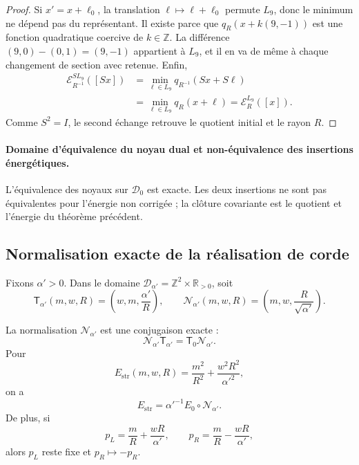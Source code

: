 \begin{proof}
Si \(x'=x+\ell_0\), la translation
\(\ell\mapsto\ell+\ell_0\) permute \(L_9\), donc le minimum ne dépend pas du
représentant. Il existe parce que \(q_R(x+k(9,-1))\) est une fonction quadratique
coercive de \(k\in\mathbb Z\). La différence
\((9,0)-(0,1)=(9,-1)\) appartient à \(L_9\), et il en va de même à chaque changement
de section avec retenue. Enfin,
\[
\begin{aligned}
 \mathcal E_{R^{-1}}^{SL_9}([Sx])
 &=\min_{\ell\in L_9}q_{R^{-1}}(Sx+S\ell)\\
 &=\min_{\ell\in L_9}q_R(x+\ell)
 =\mathcal E_R^{L_9}([x]).
\end{aligned}
\]
Comme \(S^2=I\), le second échange retrouve le quotient initial et le
rayon \(R\).
\end{proof}

\paragraph{Domaine d'équivalence du noyau dual et non-équivalence des insertions énergétiques.}
L'équivalence des noyaux sur \(\mathscr D_0\) est exacte. Les deux
insertions ne sont pas équivalentes pour l'énergie non corrigée ; la clôture
covariante est le quotient et l'énergie du théorème précédent.

\subsection{Normalisation exacte de la réalisation de corde}

Fixons \(\alpha'>0\). Dans le domaine
\(\mathscr D_{\alpha'}=\mathbb Z^2\times\mathbb R_{>0}\), soit
\[
 \mathsf T_{\alpha'}(m,w,R)=\left(w,m,\frac{\alpha'}R\right),
 \qquad
 \mathcal N_{\alpha'}(m,w,R)
 =\left(m,w,\frac R{\sqrt{\alpha'}}\right).
\]

\begin{theorem}
\label{thm:cierre-vtm-normalizacion-alpha-t}
La normalisation \(\mathcal N_{\alpha'}\) est une conjugaison exacte :
\[
 \boxed{\mathcal N_{\alpha'}\mathsf T_{\alpha'}
 =\mathsf T_0\mathcal N_{\alpha'}.}
\]
Pour
\[
 E_{\mathrm{str}}(m,w,R)
 =\frac{m^2}{R^2}+\frac{w^2R^2}{\alpha'^2},
\]
on a
\[
 E_{\mathrm{str}}
 =\alpha'^{-1}E_0\circ\mathcal N_{\alpha'}.
\]
De plus, si
\[
 p_L=\frac mR+\frac{wR}{\alpha'},
 \qquad p_R=\frac mR-\frac{wR}{\alpha'},
\]
alors \(p_L\) reste fixe et \(p_R\mapsto-p_R\).
\end{theorem}

